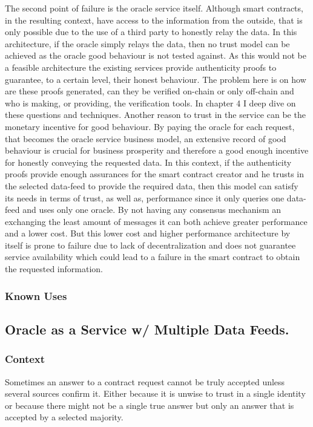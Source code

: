 The second point of failure is the oracle service itself. Although smart contracts, in the resulting context, have access to the information from the outside, that is only possible due to the use of a third party to honestly relay the data. In this architecture, if the oracle simply relays the data, then no trust model can be achieved as the oracle good behaviour is not tested against. As this would not be a feasible architecture the existing services provide authenticity proofs to guarantee, to a certain level, their honest behaviour. The problem here is on how are these proofs generated, can they be verified on-chain or only off-chain and who is making, or providing, the verification tools. In chapter 4 I deep dive on these questions and techniques. Another reason to trust in the service can be the monetary incentive for good behaviour. By paying the oracle for each request, that becomes the oracle service business model, an extensive record of good behaviour is crucial for business prosperity and therefore a good enough incentive for honestly conveying the requested data.
In this context, if the authenticity proofs provide enough assurances for the smart contract creator and he trusts in the selected data-feed to provide the required data, then this model can satisfy its needs in terms of trust, as well as, performance since it only queries one data-feed and uses only one oracle. By not having any consensus mechanism an exchanging the least amount of messages it can both achieve greater performance and a lower cost. But this lower cost and higher performance architecture by itself is prone to failure due to lack of decentralization and does not guarantee service availability which could lead to a failure in the smart contract to obtain the requested information.

\subsubsection{Known Uses}


\subsection{Oracle as a Service w/ Multiple Data Feeds.}\label{OaaSwMultipleDataFeed}

\subsubsection{Context}
Sometimes an answer to a contract request cannot be truly accepted unless several sources confirm it. Either because it is unwise to trust in a single identity or because there might not be a single true answer but only an answer that is accepted by a selected majority.

